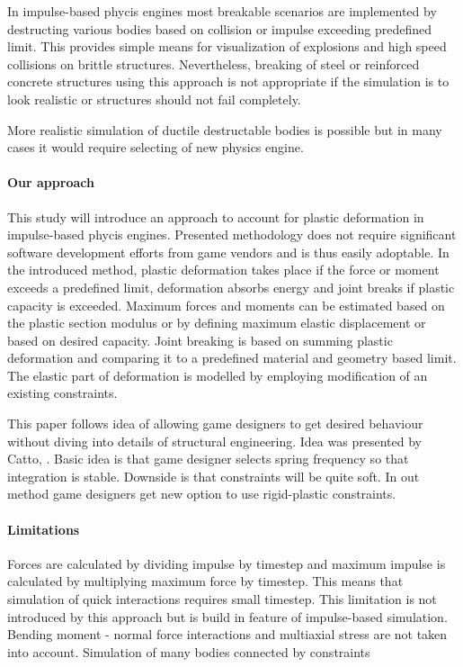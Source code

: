 \documentclass{jcgt}
\begin{document}
In impulse-based phycis engines most breakable scenarios  are implemented by destructing various bodies based on collision
or impulse exceeding predefined limit. This provides simple means for visualization of explosions and high speed collisions 
on brittle structures.  
Nevertheless, breaking of steel or reinforced concrete structures using this approach 
is not appropriate if the simulation is to look realistic or structures should not fail completely.

More realistic simulation of ductile destructable bodies is possible but in many cases it would require 
selecting of new physics engine.

\paragraph{Our approach}
This study will introduce an approach to account for plastic deformation in impulse-based phycis engines.   
Presented methodology does not require significant software development efforts from
game vendors and is thus easily adoptable. 
In the introduced method, plastic deformation takes place if the force or moment exceeds a predefined 
limit, deformation absorbs energy and joint breaks if plastic capacity is exceeded. 
Maximum forces and moments can be estimated based on the plastic section modulus or
by defining maximum elastic displacement or based on desired capacity.
Joint breaking is based on summing plastic deformation and comparing it to a
predefined material and geometry based limit. The elastic part of deformation is modelled by employing 
modification of an existing constraints. 

This paper follows idea of
allowing game designers to get desired behaviour without diving into details of structural engineering.
Idea was presented by Catto, \cite{ecsc}. Basic idea is that game designer selects spring frequency so that
integration is stable. Downside is that constraints will be quite soft. In out method game designers get new option
to use rigid-plastic constraints.

\paragraph{Limitations}
Forces are calculated by dividing impulse by timestep and maximum impulse is calculated
by multiplying maximum force by timestep. 
This means that simulation of quick interactions requires small timestep.
This limitation is not introduced by this approach but is build in feature of impulse-based simulation.
Bending moment - normal force interactions and multiaxial stress are not taken into account. 
Simulation of many bodies connected by constraints
\end{document}
